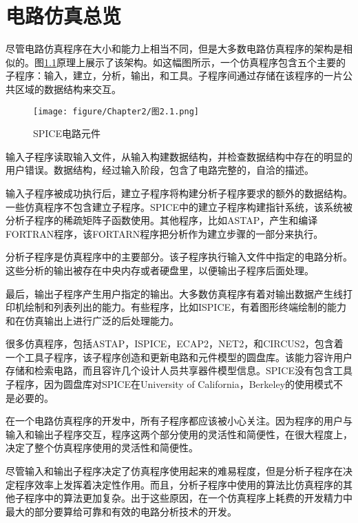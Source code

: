 \chapter{电路仿真总览}
\label{chap:2}

尽管电路仿真程序在大小和能力上相当不同，但是大多数电路仿真程序的架构是相似的。图\ref{图2.1}原理上展示了该架构。如这幅图所示，一个仿真程序包含五个主要的子程序：输入，建立，分析，输出，和工具。子程序间通过存储在该程序的一片公共区域的数据结构来交互。

\begin{figure}[htbp]
\small
    \centering
    \texttt{[image: figure/Chapter2/图2.1.png]}
    \caption{SPICE电路元件}
    \label{图2.1}
\end{figure}

输入子程序读取输入文件，从输入构建数据结构，并检查数据结构中存在的明显的用户错误。数据结构，经过输入阶段，包含了电路完整的，自洽的描述。

输入子程序被成功执行后，建立子程序将构建分析子程序要求的额外的数据结构。一些仿真程序不包含建立子程序。SPICE中的建立子程序构建指针系统，该系统被分析子程序的稀疏矩阵子函数使用。其他程序，比如ASTAP\cite{ref-28,ref-29}，产生和编译FORTRAN程序，该FORTARN程序把分析作为建立步骤的一部分来执行。

分析子程序是仿真程序中的主要部分。该子程序执行输入文件中指定的电路分析。这些分析的输出被存在中央内存或者硬盘里，以便输出子程序后面处理。

最后，输出子程序产生用户指定的输出。大多数仿真程序有着对输出数据产生线打印机绘制和列表列出的能力。有些程序，比如ISPICE\cite{ref-30}，有着图形终端绘制的能力和在仿真输出上进行广泛的后处理能力。

很多仿真程序，包括ASTAP，ISPICE，ECAP2\cite{ref-31,ref-32}，NET2\cite{ref-33}，和CIRCUS2\cite{ref-34}，包含着一个工具子程序，该子程序创造和更新电路和元件模型的圆盘库。该能力容许用户存储和检索电路，而且容许几个设计人员共享器件模型信息。SPICE没有包含工具子程序，因为圆盘库对SPICE在University of California，Berkeley的使用模式不是必要的。

在一个电路仿真程序的开发中，所有子程序都应该被小心关注。因为程序的用户与输入和输出子程序交互，程序这两个部分使用的灵活性和简便性，在很大程度上，决定了整个仿真程序使用的灵活性和简便性。

尽管输入和输出子程序决定了仿真程序使用起来的难易程度，但是分析子程序在决定程序效率上发挥着决定性作用。而且，分析子程序中使用的算法比仿真程序的其他子程序中的算法更加复杂。出于这些原因，在一个仿真程序上耗费的开发精力中最大的部分要算给可靠和有效的电路分析技术的开发。

